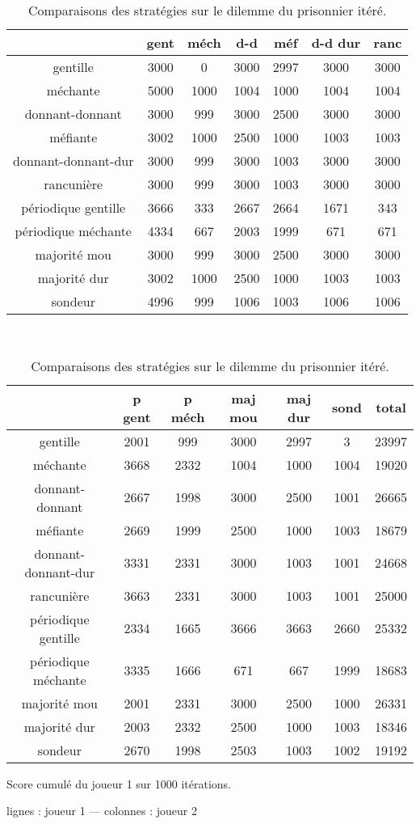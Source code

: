 \documentclass[10pt]{article}
\begin{document}
\begin{table}
\caption[Comparaison des stratégies]{Comparaisons des stratégies sur le dilemme du prisonnier itéré.}
\label{strat_table}
\begin{center}
\begin{tabular}{|c|cccccc|}
\hline
& gent & méch & d-d & méf & d-d dur & ranc \\ \hline
gentille & 3000& 0& 3000& 2997& 3000& 3000\\
méchante & 5000& 1000& 1004& 1000& 1004& 1004\\
donnant-donnant & 3000& 999& 3000& 2500& 3000& 3000\\
méfiante & 3002& 1000& 2500& 1000& 1003& 1003\\
donnant-donnant-dur & 3000& 999& 3000& 1003& 3000& 3000\\
rancunière & 3000& 999& 3000& 1003& 3000& 3000\\
périodique gentille & 3666& 333& 2667& 2664& 1671& 343\\
périodique méchante & 4334& 667& 2003& 1999& 671& 671\\
majorité mou & 3000& 999& 3000& 2500& 3000& 3000\\
majorité dur & 3002& 1000& 2500& 1000& 1003& 1003\\
sondeur & 4996& 999& 1006& 1003& 1006& 1006\\
\hline
\end{tabular}
\\
\begin{tabular}{|c|cccccc|}
\hline
& p gent & p méch & maj mou & maj dur & sond & total \\ \hline
gentille & 2001& 999& 3000& 2997& 3& 23997\\
méchante & 3668& 2332& 1004& 1000& 1004& 19020\\
donnant-donnant & 2667& 1998& 3000& 2500& 1001& 26665\\
méfiante & 2669& 1999& 2500& 1000& 1003& 18679\\
donnant-donnant-dur & 3331& 2331& 3000& 1003& 1001& 24668\\
rancunière & 3663& 2331& 3000& 1003& 1001& 25000\\
périodique gentille & 2334& 1665& 3666& 3663& 2660& 25332\\
périodique méchante & 3335& 1666& 671& 667& 1999& 18683\\
majorité mou & 2001& 2331& 3000& 2500& 1000& 26331\\
majorité dur & 2003& 2332& 2500& 1000& 1003& 18346\\
sondeur & 2670& 1998& 2503& 1003& 1002& 19192\\
\hline
\end{tabular}
\end{center}
Score cumulé du joueur 1 sur 1000 itérations.

lignes : joueur 1 --- colonnes : joueur 2
\end{table}
\end{document}
